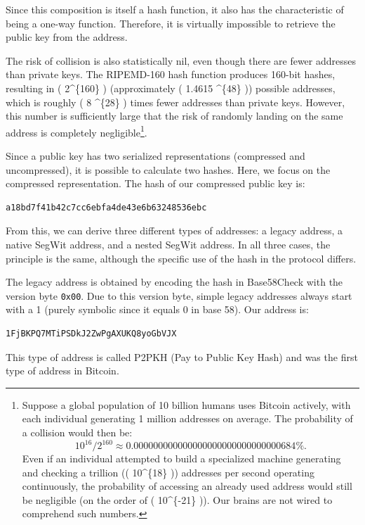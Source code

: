 \documentclass[
  a5paper,
  smalldemyvopaper,10pt,twoside,onecolumn,openright,extrafontsizes,hidelinks]{memoir}
\begin{document}
Since this composition is itself a hash function, it also has the
characteristic of being a one-way function. Therefore, it is virtually
impossible to retrieve the public key from the address.

The risk of collision is also statistically nil, even though there are
fewer addresses than private keys. The RIPEMD-160 hash function produces
160-bit hashes, resulting in ( 2\^{}\{160\} ) (approximately ( 1.4615
\^{}\{48\} )) possible addresses, which is roughly ( 8
\^{}\{28\} ) times fewer addresses than private keys. However,
this number is sufficiently large that the risk of randomly landing on
the same address is completely negligible\footnote{Suppose a global
  population of 10 billion humans uses Bitcoin actively, with each
  individual generating 1 million addresses on average. The probability
  of a collision would then be:
  \[10^{16} / 2^{160} \approx 0.000000000000000000000000000000684\%.\]
  Even if an individual attempted to build a specialized machine
  generating and checking a trillion (( 10\^{}\{18\} )) addresses per
  second operating continuously, the probability of accessing an already
  used address would still be negligible (on the order of (
  10\^{}\{-21\} )). Our brains are not wired to comprehend such numbers.}.

Since a public key has two serialized representations (compressed and
uncompressed), it is possible to calculate two hashes. Here, we focus on
the compressed representation. The hash of our compressed public key is:

\begin{verbatim}
a18bd7f41b42c7cc6ebfa4de43e6b63248536ebc
\end{verbatim}

From this, we can derive three different types of addresses: a legacy
address, a native SegWit address, and a nested SegWit address. In all
three cases, the principle is the same, although the specific use of the
hash in the protocol differs.

The legacy address is obtained by encoding the hash in Base58Check with
the version byte \texttt{0x00}. Due to this version byte, simple legacy
addresses always start with a 1 (purely symbolic since it equals 0 in
base 58). Our address is:

\begin{verbatim}
1FjBKPQ7MTiPSDkJ2ZwPgAXUKQ8yoGbVJX
\end{verbatim}

This type of address is called P2PKH (Pay to Public Key Hash) and was
the first type of address in Bitcoin.
\end{document}
